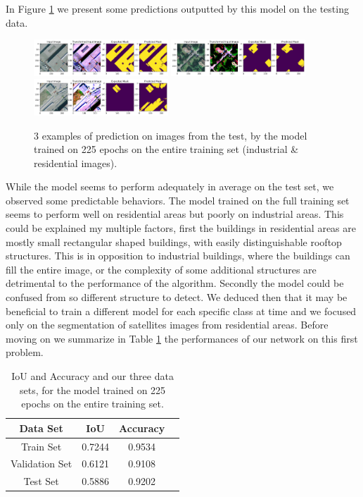 \documentclass[9pt,conference,compsocconf]{IEEEtran}
\begin{document}
In Figure \ref{fig:pred_full} we present some predictions outputted by this model on the testing data.

\begin{figure}[h!]
    \centering
    \includegraphics[width=0.45\textwidth]{figures/pred_full_1.png}
    \includegraphics[width=0.45\textwidth]{figures/pred_full_2.png}
    \includegraphics[width=0.45\textwidth]{figures/pred_full_3.png}
    \caption{\footnotesize{3 examples of prediction on images from the test, by the model trained on 225 epochs on the entire training set (industrial \& residential images).}}
    \label{fig:pred_full}
\end{figure}

While the model seems to perform adequately in average on the test set, we observed some predictable behaviors. The model trained on the full training set seems to perform well on residential areas but poorly on industrial areas. This could be explained my multiple factors, first the buildings in residential areas are mostly small rectangular shaped buildings, with easily distinguishable rooftop structures. This is in opposition to industrial buildings, where the buildings can fill the entire image, or the complexity of some additional structures are detrimental to the performance of the algorithm. Secondly the model could be confused from so different structure to detect.
We deduced then that it may be beneficial to train a different model for each specific class at time and we focused only on the segmentation of satellites images from residential areas. Before moving on we summarize in Table \ref{fig:my_label} the performances of our network on this first problem.

\begin{table}[h!]
    \centering
    \begin{tabular}{ |c|c|c|c| } 
\hline
Data Set & IoU & Accuracy \\
\hline
Train Set & 0.7244 & 0.9534 \\ 
Validation Set & 0.6121 & 0.9108 \\ 
Test Set & 0.5886 & 0.9202 \\ 
\hline
\end{tabular}
    \caption{\footnotesize{IoU and Accuracy and our three data sets, for the model trained on 225 epochs on the entire training set.}
    \label{fig:my_label}}
\end{table}
\end{document}
